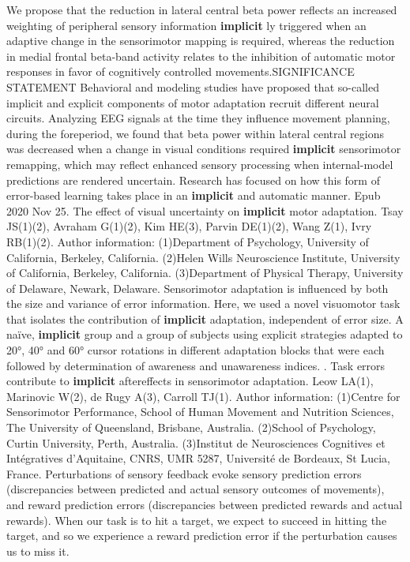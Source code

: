 \documentclass[11pt]{article}
\begin{document}
\newline  [  12  ]   We propose that the reduction  in lateral central beta power reflects an increased weighting of peripheral  sensory information   \textbf {  implicit  }  ly triggered when an adaptive change in the  sensorimotor mapping is required, whereas the reduction in medial frontal  beta-band activity relates to the inhibition of automatic motor responses in  favor of cognitively controlled movements.SIGNIFICANCE STATEMENT Behavioral and  modeling studies have proposed that so-called implicit and explicit components  of motor adaptation recruit different neural circuits.
\newline  [  13  ]   Analyzing EEG signals at the time they influence movement planning,  during the foreperiod, we found that beta power within lateral central regions  was decreased when a change in visual conditions required   \textbf {  implicit  }   sensorimotor  remapping, which may reflect enhanced sensory processing when internal-model  predictions are rendered uncertain.
\newline  [  14  ]   Research has focused on how this form of error-based learning takes  place in an   \textbf {  implicit  }   and automatic manner.
\newline  [  15  ]   Epub 2020  Nov 25.  The effect of visual uncertainty on   \textbf {  implicit  }   motor adaptation.  Tsay JS(1)(2), Avraham G(1)(2), Kim HE(3), Parvin DE(1)(2), Wang Z(1), Ivry  RB(1)(2).  Author information: (1)Department of Psychology, University of California, Berkeley, California. (2)Helen Wills Neuroscience Institute, University of California, Berkeley,  California. (3)Department of Physical Therapy, University of Delaware, Newark, Delaware.  Sensorimotor adaptation is influenced by both the size and variance of error  information.
\newline  [  16  ]   Here, we used a novel visuomotor task that  isolates the contribution of   \textbf {  implicit  }   adaptation, independent of error size.
\newline  [  17  ]   A naïve,   \textbf {  implicit  }   group and a group of  subjects using explicit strategies adapted to 20°, 40° and 60° cursor rotations  in different adaptation blocks that were each followed by determination of  awareness and unawareness indices.
.  Task errors contribute to   \textbf {  implicit  }   aftereffects in sensorimotor adaptation.  Leow LA(1), Marinovic W(2), de Rugy A(3), Carroll TJ(1).  Author information: (1)Centre for Sensorimotor Performance, School of Human Movement and Nutrition  Sciences, The University of Queensland, Brisbane, Australia. (2)School of Psychology, Curtin University, Perth, Australia. (3)Institut de Neurosciences Cognitives et Intégratives d'Aquitaine, CNRS, UMR  5287, Université de Bordeaux, St Lucia, France.  Perturbations of sensory feedback evoke sensory prediction errors (discrepancies  between predicted and actual sensory outcomes of movements), and reward  prediction errors (discrepancies between predicted rewards and actual rewards).  When our task is to hit a target, we expect to succeed in hitting the target,  and so we experience a reward prediction error if the perturbation causes us to  miss it.
\end{document}
